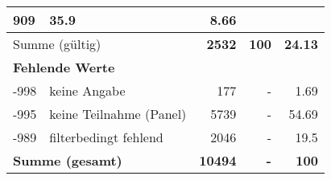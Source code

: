 \begin{longtable}{lXrrr}
       \num{909} &
       \num[round-mode=places,round-precision=2]{35.9} &
         \num[round-mode=places,round-precision=2]{8.66} \\
     \midrule
     \multicolumn{2}{l}{Summe (gültig)} &
       \textbf{\num{2532}} &
     \textbf{\num{100}} &
       \textbf{\num[round-mode=places,round-precision=2]{24.13}} \\
     \multicolumn{5}{l}{\textbf{Fehlende Werte}}\\
       -998 &
       keine Angabe &
         \num{177} &
        - &
         \num[round-mode=places,round-precision=2]{1.69} \\
       -995 &
       keine Teilnahme (Panel) &
         \num{5739} &
        - &
         \num[round-mode=places,round-precision=2]{54.69} \\
       -989 &
       filterbedingt fehlend &
         \num{2046} &
        - &
         \num[round-mode=places,round-precision=2]{19.5} \\
     \midrule
     \multicolumn{2}{l}{\textbf{Summe (gesamt)}} &
          \textbf{\num{10494}} &
        \textbf{-} &
        \textbf{\num{100}} \\
     \bottomrule
     \end{longtable}
     
